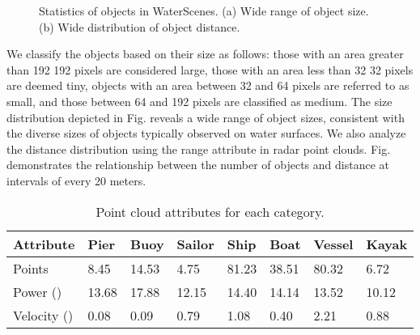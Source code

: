 \documentclass[lettersize,journal]{IEEEtran}
\begin{document}
\begin{figure}[h]
\centering
{}
\quad
\hspace{-6mm}
\caption{Statistics of objects in WaterScenes. (a) Wide range of object size. (b) Wide distribution of object distance.}
\label{fig:statistics}
\end{figure}

We classify the objects based on their size as follows: those with an area greater than 192  192 pixels are considered large, those with an area less than 32  32 pixels are deemed tiny, objects with an area between 32 and 64 pixels are referred to as small, and those between 64 and 192 pixels are classified as medium.
The size distribution depicted in Fig.  reveals a wide range of object sizes, consistent with the diverse sizes of objects typically observed on water surfaces. 
We also analyze the distance distribution using the range attribute in radar point clouds. Fig.  demonstrates the relationship between the number of objects and distance at intervals of every 20 meters.

\begin{table}[htbp]
\caption{Point cloud attributes for each category.}
\setlength\tabcolsep{4pt}
\center
\footnotesize
\begin{tabular*}{\linewidth}{p{1.8cm}<{}|p{0.6cm}<{\centering}p{0.7cm}<{\centering}p{0.7cm}<{\centering}p{0.7cm}<{\centering}p{0.7cm}<{\centering}p{0.7cm}<{\centering}p{0.7cm}<{\centering}}
\toprule
\bf{Attribute} & \bf{Pier} & \bf{Buoy} & \bf{Sailor} & \bf{Ship} & \bf{Boat} & \bf{Vessel} & \bf{Kayak}  \\\midrule
Points & 8.45 & 14.53 & 4.75 & 81.23 & 38.51 & 80.32 & 6.72\\
Power ()& 13.68 & 17.88 & 12.15 & 14.40 & 14.14 & 13.52 & 10.12   \\
Velocity () & 0.08 & 0.09 & 0.79 & 1.08 & 0.40 & 2.21 & 0.88\\
\bottomrule
\end{tabular*}
\label{tab:radar-statistics}
\end{table}
\end{document}
